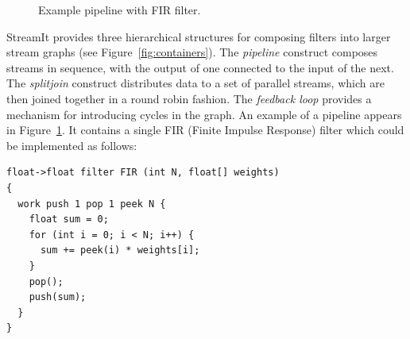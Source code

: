 \documentclass[times, 10pt,twocolumn]{article}
\begin{document}
\begin{figure}[t]
\begin{center}
  \caption{Example pipeline with FIR filter.}
  \label{fig:pipeline}
\end{center}
\end{figure}

StreamIt provides three  hierarchical structures for composing filters
into larger stream graphs (see Figure~\ref{fig:containers}).  The {\it
pipeline} construct  composes streams in sequence, with  the output of
one connected to the input of the next.  The {\it splitjoin} construct
distributes data to  a set of parallel streams,  which are then joined
together in a round robin fashion.   The {\it feedback loop} provides a
mechanism  for introducing  cycles  in  the graph.   An  example of  a
pipeline  appears  in  Figure~\ref{fig:pipeline}.  It  contains  a
single  FIR   (Finite  Impulse   Response)  filter which   could  be
implemented as follows:
\begin{scriptsize}
\begin{verbatim}
float->float filter FIR (int N, float[] weights) 
{
  work push 1 pop 1 peek N {
    float sum = 0;
    for (int i = 0; i < N; i++) {
      sum += peek(i) * weights[i];
    }
    pop();
    push(sum);
  }
}
\end{verbatim}
\end{scriptsize}
\end{document}
